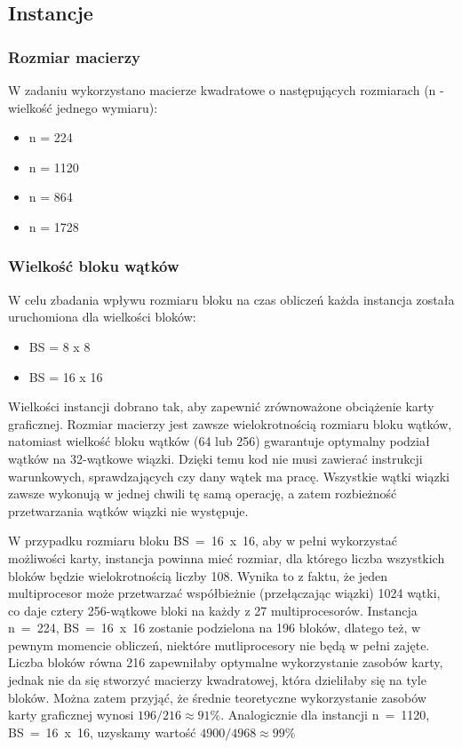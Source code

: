 \documentclass[12pt,a4paper]{article}
\begin{document}
\subsection{Instancje}

\subsubsection*{Rozmiar macierzy}
W zadaniu wykorzystano macierze kwadratowe o następujących rozmiarach (n - wielkość jednego wymiaru):
\begin{itemize}
\item n = 224
\item n = 1120
\item n = 864
\item n = 1728
\end{itemize}

\subsubsection*{Wielkość bloku wątków}

W celu zbadania wpływu rozmiaru bloku na czas obliczeń każda instancja została uruchomiona dla wielkości bloków:
\begin{itemize}
\item BS = 8 x 8
\item BS = 16 x 16
\end{itemize}

Wielkości instancji dobrano tak, aby zapewnić zrównoważone obciążenie karty graficznej. Rozmiar macierzy jest zawsze wielokrotnością rozmiaru bloku wątków, natomiast wielkość bloku wątków (64 lub 256) gwarantuje optymalny podział wątków na 32-wątkowe wiązki. Dzięki temu kod nie musi zawierać instrukcji warunkowych, sprawdzających czy dany wątek ma pracę. Wszystkie wątki wiązki zawsze wykonują w jednej chwili tę samą operację, a zatem rozbieżność przetwarzania wątków wiązki nie występuje.

W przypadku rozmiaru bloku BS~=~16~x~16, aby w pełni wykorzystać możliwości karty, instancja powinna mieć rozmiar, dla którego liczba wszystkich bloków będzie wielokrotnością liczby 108. Wynika to z faktu, że jeden multiprocesor może przetwarzać współbieżnie (przełączając wiązki) 1024 wątki, co daje cztery 256-wątkowe bloki na każdy z 27 multiprocesorów. Instancja  n~=~224, BS~=~16~x~16 zostanie podzielona na 196 bloków, dlatego też, w pewnym momencie obliczeń, niektóre mutliprocesory nie będą w pełni zajęte. Liczba bloków równa 216 zapewniłaby optymalne wykorzystanie zasobów karty, jednak nie da się stworzyć macierzy kwadratowej, która dzieliłaby się na tyle bloków. Można zatem przyjąć, że średnie teoretyczne wykorzystanie zasobów karty graficznej wynosi $196 / 216 \approx 91\% $. Analogicznie dla instancji  n~=~1120, BS~=~16~x~16, uzyskamy wartość $4900 / 4968 \approx 99\% $
\end{document}
